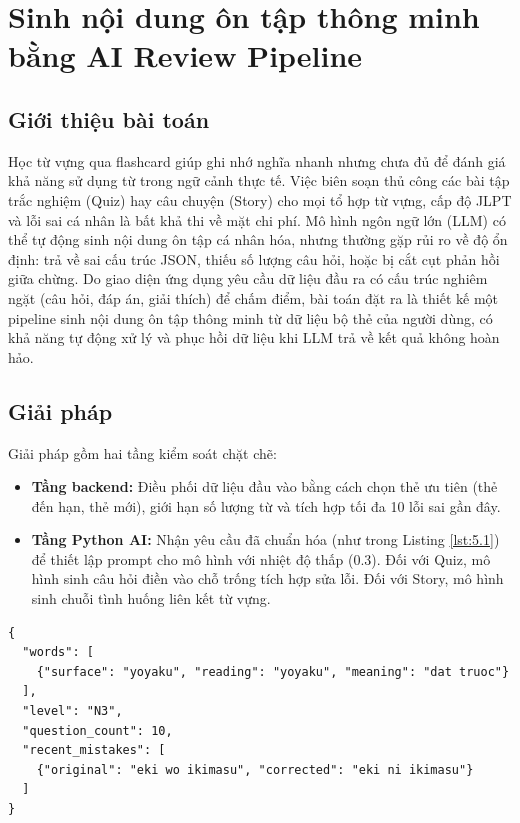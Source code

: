 \documentclass[../DoAn.tex]{subfiles}
\begin{document}
\section{Sinh nội dung ôn tập thông minh bằng AI Review Pipeline}
\label{section:5.3}

\subsection{Giới thiệu bài toán}
\label{subsection:5.3.1}

Học từ vựng qua flashcard giúp ghi nhớ nghĩa nhanh nhưng chưa đủ để đánh giá khả năng sử dụng từ trong ngữ cảnh thực tế. Việc biên soạn thủ công các bài tập trắc nghiệm (Quiz) hay câu chuyện (Story) cho mọi tổ hợp từ vựng, cấp độ JLPT và lỗi sai cá nhân là bất khả thi về mặt chi phí. Mô hình ngôn ngữ lớn (LLM) có thể tự động sinh nội dung ôn tập cá nhân hóa, nhưng thường gặp rủi ro về độ ổn định: trả về sai cấu trúc JSON, thiếu số lượng câu hỏi, hoặc bị cắt cụt phản hồi giữa chừng. Do giao diện ứng dụng yêu cầu dữ liệu đầu ra có cấu trúc nghiêm ngặt (câu hỏi, đáp án, giải thích) để chấm điểm, bài toán đặt ra là thiết kế một pipeline sinh nội dung ôn tập thông minh từ dữ liệu bộ thẻ của người dùng, có khả năng tự động xử lý và phục hồi dữ liệu khi LLM trả về kết quả không hoàn hảo.

\subsection{Giải pháp}
\label{subsection:5.3.2}

Giải pháp gồm hai tầng kiểm soát chặt chẽ:
\begin{itemize}
    \item \textbf{Tầng backend:} Điều phối dữ liệu đầu vào bằng cách chọn thẻ ưu tiên (thẻ đến hạn, thẻ mới), giới hạn số lượng từ và tích hợp tối đa 10 lỗi sai gần đây.
    \item \textbf{Tầng Python AI:} Nhận yêu cầu đã chuẩn hóa (như trong Listing \ref{lst:5.1}) để thiết lập prompt cho mô hình với nhiệt độ thấp (0.3). Đối với Quiz, mô hình sinh câu hỏi điền vào chỗ trống tích hợp sửa lỗi. Đối với Story, mô hình sinh chuỗi tình huống liên kết từ vựng.
\end{itemize}

\begin{lstlisting}[caption={Ví dụ đầu vào của AI Review Pipeline}, label={lst:5.1}, captionpos=b]
{
  "words": [
    {"surface": "yoyaku", "reading": "yoyaku", "meaning": "dat truoc"}
  ],
  "level": "N3",
  "question_count": 10,
  "recent_mistakes": [
    {"original": "eki wo ikimasu", "corrected": "eki ni ikimasu"}
  ]
}
\end{lstlisting}
\end{document}
